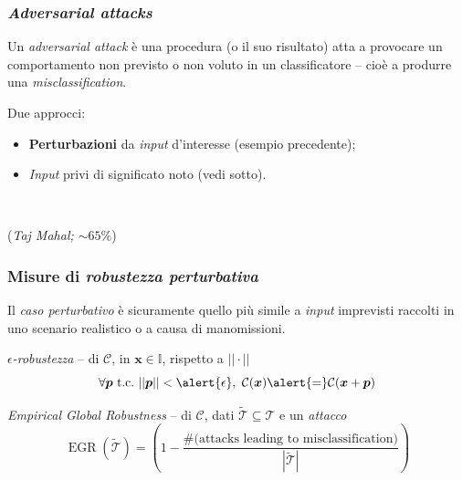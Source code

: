 \documentclass{beamer}
\DeclareMathOperator*{\EGR}{EGR}
\begin{document}
{%

\begin{frame}
	\frametitle{\textit{Adversarial attacks}}
	Un \textit{adversarial attack} è una procedura (o il suo risultato) atta a provocare un comportamento \alert{non previsto} o \alert{non voluto} in un classificatore -- cioè a produrre una \textit{misclassification}.

	\hfill\break

	Due approcci:

	\begin{itemize}
	\item{\textbf{Perturbazioni} da \textit{input} d'interesse (esempio precedente);}
	\item{\textit{Input} privi di significato noto (vedi sotto).}
	\end{itemize}

	\\
	{\raggedleft(\textit{Taj Mahal; $\sim 65\%$})\par}

\end{frame}


\begin{frame}
	\frametitle{Misure di \textit{robustezza perturbativa}}
	Il \textit{caso perturbativo} è sicuramente quello più simile a \textit{input} imprevisti raccolti in uno scenario realistico o a causa di manomissioni.
	\hfill\break

	\begin{block}{\textit{$\epsilon$-robustezza} -- di $\mathcal{C}$, in $\boldsymbol{x} \in \mathbb{I}$, rispetto a $||\cdot||$}
		$$
		\forall \boldsymbol{p} \ \text{t.c.} \ ||\boldsymbol{p}|| < \alert{\epsilon}, \ \mathcal{C}(\boldsymbol{x}) \alert{=} \mathcal{C}(\boldsymbol{x} +\boldsymbol{p} )
		$$
	\end{block}

	\begin{block}{\textit{Empirical Global Robustness} -- di $\mathcal{C}$, dati $\mathcal{\tilde{T}} \subseteq \mathcal{T}$ e un \textit{attacco}}
		$$\EGR({\tilde{\mathcal{T}}}) = \left( 1 - \frac{\# \text{(attacks leading to misclassification)}}{|\mathcal{\tilde{T}}|} \right)$$
	\end{block}


\end{frame}}
\end{document}

